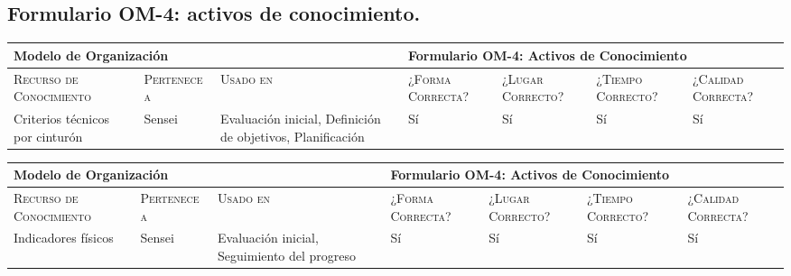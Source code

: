 \documentclass[12pt,a4paper,twoside,spanish]{article}      %
\begin{document}
        
        \pagebreak

        
        \subsection{Formulario OM-4: activos de conocimiento.}
        
            \begin{table}[H]
                \scriptsize
                \begin{tabularx}{\textwidth}{|p{1.3cm}|p{1.3cm}|p{1.3cm}|X|X|X|X|} \hline
                
                    \multicolumn{3}{|l}{\textbf{Modelo de Organización}} & 
                    \multicolumn{4}{|l|}{\textbf{Formulario OM-4: Activos de Conocimiento}} \\ \hline\hline
                    
                    \textsc{Recurso de Conocimiento} & \textsc{Pertenece a} &  \textsc{Usado en} &  \textsc{¿Forma Correcta?} & \textsc{¿Lugar Correcto?} & \textsc{¿Tiempo Correcto?} & \textsc{¿Calidad Correcta?} \\ \hline
                    
                    Criterios técnicos por cinturón & Sensei & Evaluación inicial, Definición de objetivos, Planificación & Sí & Sí & Sí & Sí \\ \hline
                    
                \end{tabularx}
                \label{tab.OM4-criterios}
            \end{table}


            \begin{table}[H]
                \scriptsize
                \begin{tabularx}{\textwidth}{|p{1.3cm}|p{1.3cm}|p{1.3cm}|X|X|X|X|} \hline
                    \multicolumn{3}{|l}{\textbf{Modelo de Organización}} & 
                    \multicolumn{4}{|l|}{\textbf{Formulario OM-4: Activos de Conocimiento}} \\ \hline\hline
                    
                    \textsc{Recurso de Conocimiento} & \textsc{Pertenece a} &  \textsc{Usado en} &  \textsc{¿Forma Correcta?} & \textsc{¿Lugar Correcto?} & \textsc{¿Tiempo Correcto?} & \textsc{¿Calidad Correcta?} \\ \hline
                    
                    Indicadores físicos & Sensei & Evaluación inicial, Seguimiento del progreso & Sí & Sí & Sí & Sí \\ \hline
                    
                \end{tabularx}
                \label{tab.OM4-indicadores}
            \end{table}
\end{document}
